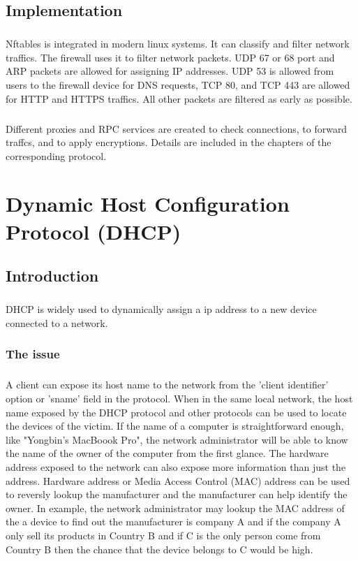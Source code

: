 \documentclass[mscthesis]{usiinfthesis}
\begin{document}
\section{Implementation}
\paragraph{}
Nftables is integrated in modern linux systems. It can classify and filter network traffics. The firewall uses it to filter network packets. UDP 67 or 68 port and ARP packets are allowed for assigning IP addresses. UDP 53 is allowed from users to the firewall device for DNS requests, TCP 80, and TCP 443 are allowed for HTTP and HTTPS traffics. All other packets are filtered as early as possible.
\paragraph{}
Different proxies and RPC services are created to check connections, to forward traffcs, and to apply encryptions. Details are included in the chapters of the corresponding protocol.

\chapter{Dynamic Host Configuration Protocol (DHCP)}

\section{Introduction}
\paragraph{}
DHCP is widely used to dynamically assign a ip address to a new device connected to a network.

\subsection{The issue}
\paragraph{}
A client can expose its host name to the network from the 'client identifier' option or 'sname' field in the protocol. When in the same local network, the host name exposed by the DHCP protocol and other protocols can be used to locate the devices of the victim. If the name of a computer is straightforward enough, like "Yongbin's MacBoook Pro", the network administrator will be able to know the name of the owner of the computer from the first glance. The hardware address exposed to the network can also expose more information than just the address. Hardware address or Media Access Control (MAC) address can be used to reversly lookup the manufacturer and the manufacturer can help identify the owner. In example, the network administrator may lookup the MAC address of the a device to find out the manufacturer is company A and if the company A only sell its products in Country B and if C is the only person come from Country B then the chance that the device belongs to C would be high.
\end{document}
